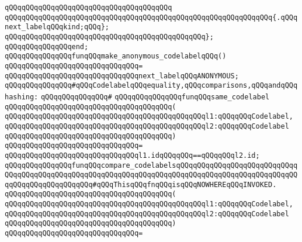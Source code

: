 \verb|qQQqqQQqqQQqqQQqqQQqqQQqqQQqqQQqqQQqqQQq|\newline
\verb|qQQqqQQqqQQqqQQqqQQqqQQqqQQqqQQqqQQqqQQqqQQqqQQqqQQqqQQqqQQqqQQq{.qQQqnext_labelqQQqkind;qQQq};|\newline
\verb|qQQqqQQqqQQqqQQqqQQqqQQqqQQqqQQqqQQqqQQqqQQqqQQq};|\newline
\verb|qQQqqQQqqQQqqQQqend;|\newline
\newline
\verb|qQQqqQQqqQQqqQQqfunqQQqmake_anonymous_codelabelqQQq()|\newline
\verb|qQQqqQQqqQQqqQQqqQQqqQQqqQQqqQQq=|\newline
\verb|qQQqqQQqqQQqqQQqqQQqqQQqqQQqqQQqnext_labelqQQqANONYMOUS;|\newline
\newline
\newline
\verb|qQQqqQQqqQQqqQQq#qQQqCodelabelqQQqequality,qQQqcomparisons,qQQqandqQQqhashing:|\newline
\verb|qQQqqQQqqQQqqQQq#|\newline
\verb|qQQqqQQqqQQqqQQqfunqQQqsame_codelabel|\newline
\verb|qQQqqQQqqQQqqQQqqQQqqQQqqQQqqQQqqQQqqQQq(|\newline
\verb|qQQqqQQqqQQqqQQqqQQqqQQqqQQqqQQqqQQqqQQqqQQqqQQql1:qQQqqQQqCodelabel,|\newline
\verb|qQQqqQQqqQQqqQQqqQQqqQQqqQQqqQQqqQQqqQQqqQQqqQQql2:qQQqqQQqCodelabel|\newline
\verb|qQQqqQQqqQQqqQQqqQQqqQQqqQQqqQQqqQQqqQQq)|\newline
\verb|qQQqqQQqqQQqqQQqqQQqqQQqqQQqqQQq=|\newline
\verb|qQQqqQQqqQQqqQQqqQQqqQQqqQQqqQQql1.idqQQqqQQq==qQQqqQQql2.id;|\newline
\newline
\verb|qQQqqQQqqQQqqQQqfunqQQqcompare_codelabelsqQQqqQQqqQQqqQQqqQQqqQQqqQQqqQQqqQQqqQQqqQQqqQQqqQQqqQQqqQQqqQQqqQQqqQQqqQQqqQQqqQQqqQQqqQQqqQQqqQQqqQQqqQQqqQQqqQQqqQQq#qQQqThisqQQqfnqQQqisqQQqNOWHEREqQQqINVOKED.|\newline
\verb|qQQqqQQqqQQqqQQqqQQqqQQqqQQqqQQqqQQqqQQq(|\newline
\verb|qQQqqQQqqQQqqQQqqQQqqQQqqQQqqQQqqQQqqQQqqQQqqQQql1:qQQqqQQqCodelabel,|\newline
\verb|qQQqqQQqqQQqqQQqqQQqqQQqqQQqqQQqqQQqqQQqqQQqqQQql2:qQQqqQQqCodelabel|\newline
\verb|qQQqqQQqqQQqqQQqqQQqqQQqqQQqqQQqqQQqqQQq)|\newline
\verb|qQQqqQQqqQQqqQQqqQQqqQQqqQQqqQQq=|\newline
